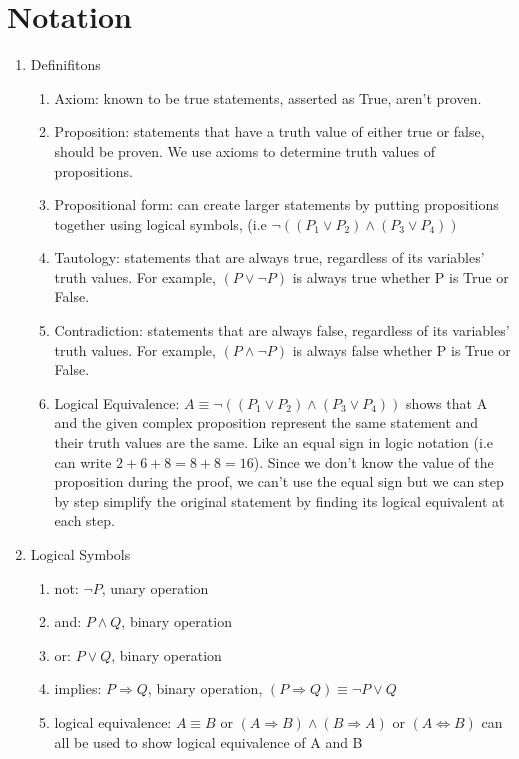 \documentclass[11pt]{article}
\begin{document}
\section*{Notation}
\begin{enumerate}

\item
Definifitons
\begin{enumerate}
\item 
Axiom: known to be true statements, asserted as True, aren't proven.
\item 
Proposition: statements that have a truth value of either true or false, should be proven. We use axioms to determine truth values of propositions.
\item 
Propositional form: can create larger statements by putting propositions together using logical symbols, (i.e  $\neg (({P_1} \vee {P_2}) \wedge ({P_3} \vee {P_4}))$
\item
Tautology: statements that are always true, regardless of its variables' truth values. For example, $(P \vee {\neg P})$ is always true whether P is True or False.
\item
Contradiction: statements that are always false, regardless of its variables' truth values. For example, $(P \wedge {\neg P})$ is always false whether P is True or False.
\item
Logical Equivalence: $A \equiv \neg (({P_1} \vee {P_2}) \wedge ({P_3} \vee {P_4}))$ shows that A and the given complex proposition represent the same statement and their truth values are the same. Like an equal sign in logic notation (i.e can write $2 + 6 + 8 = 8 + 8 = 16$). Since we don't know the value of the proposition during the proof, we can't use the equal sign but we can step by step simplify the original statement by finding its logical equivalent at each step.
\end{enumerate}

\item
Logical Symbols
\begin{enumerate}
\item not: $\neg P$, unary operation
\item and: $P \wedge Q$, binary operation
\item or: $P \vee Q$, binary operation
\item implies: $P \Rightarrow Q$, binary operation, $(P \Rightarrow Q) \equiv {\neg P} \vee Q$
\item logical equivalence: $A \equiv B$ or $(A \Rightarrow B) \wedge (B \Rightarrow A)$ or $(A \Leftrightarrow B) $ can all be used to show logical equivalence of A and B
\end{enumerate}
\end{enumerate}
\end{document}
